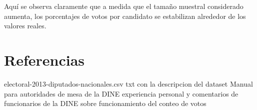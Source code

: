 \documentclass[12pt, a4paper]{article}
\begin{document}
Aqu\'i se observa claramente que a medida que el tama\~no muestral considerado aumenta, los porcentajes de votos por candidato se estabilizan alrededor de los valores reales.


\section{Referencias}
electoral-2013-diputados-nacionales.csv
txt con la descripcion del dataset
Manual para autoridades de mesa de la DINE
experiencia personal y comentarios de funcionarios de la DINE sobre funcionamiento del conteo de votos
\end{document}
